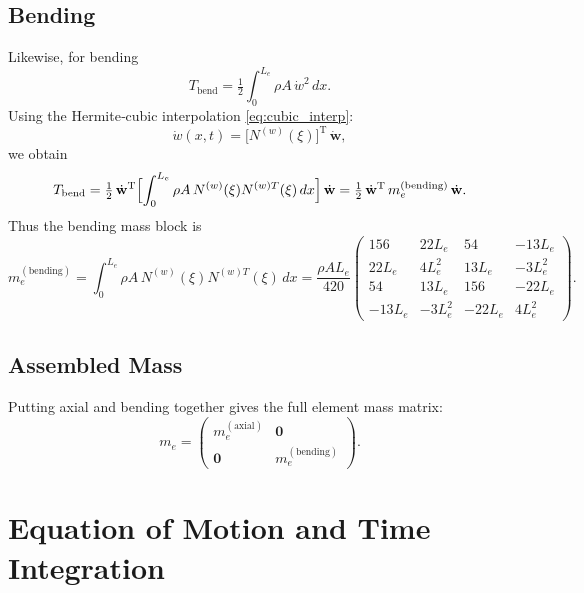 \documentclass{article}
\begin{document}
	\subsection{Bending}
	Likewise, for bending
	\begin{equation}
		T_{\mathrm{bend}}
		= \tfrac12\int_0^{L_e}\rho A\,\dot w^2\,dx.
	\end{equation}
	Using the Hermite‐cubic interpolation \eqref{eq:cubic_interp}:
	\begin{equation}
		\dot w(x,t)
		= \bigl[N^{(w)}(\xi)\bigr]^\text{T}\,\dot{\mathbf{w}},
	\end{equation}
	we obtain
	\begin{equation}
		T_{\mathrm{bend}}
		= \tfrac12\,\dot{\mathbf{w}}^\text{T}
		\Bigl[\int_0^{L_e}\rho A\,N^{(w)}(\xi)N^{(w)T}(\xi)\,dx\Bigr]
		\,\dot{\mathbf{w}}
		= \tfrac12\,\dot{\mathbf{w}}^\text{T}\,m_e^{(\mathrm{bending})}\,\dot{\mathbf{w}}.
	\end{equation}
	Thus the bending mass block is
	\begin{equation}\label{eq:me_bending}
		m_e^{(\mathrm{bending})}
		= \int_0^{L_e}\rho A\,N^{(w)}(\xi)N^{(w)T}(\xi)\,dx
		= \frac{\rho A L_e}{420}
		\begin{pmatrix}
			156 & 22L_e & 54 & -13L_e\\
			22L_e & 4L_e^2 & 13L_e & -3L_e^2\\
			54 & 13L_e & 156 & -22L_e\\
			-13L_e & -3L_e^2 & -22L_e & 4L_e^2
		\end{pmatrix}.
	\end{equation}
	
	\subsection{Assembled Mass}
	Putting axial and bending together gives the full element mass matrix:
	\begin{equation}\label{eq:me_assembled}
		m_e
		= \begin{pmatrix}
			m_e^{(\mathrm{axial})} & \mathbf{0}\\
			\mathbf{0}            & m_e^{(\mathrm{bending})}
		\end{pmatrix}.
	\end{equation}
	
	\section{Equation of Motion and Time Integration}
	
\end{document}
